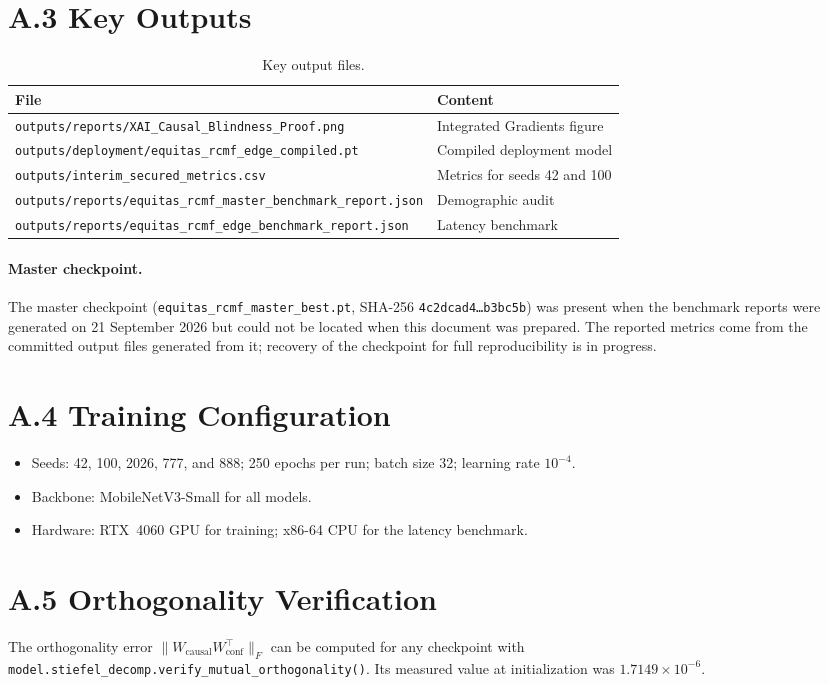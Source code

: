 \section*{A.3 Key Outputs}
\begin{table}[htbp]
\centering
\begin{tabular}{@{}ll@{}}
\toprule
\textbf{File} & \textbf{Content} \\
\midrule
\texttt{outputs/reports/XAI\_Causal\_Blindness\_Proof.png} & Integrated Gradients figure \\
\texttt{outputs/deployment/equitas\_rcmf\_edge\_compiled.pt} & Compiled deployment model \\
\texttt{outputs/interim\_secured\_metrics.csv} & Metrics for seeds 42 and 100 \\
\texttt{outputs/reports/equitas\_rcmf\_master\_benchmark\_report.json} & Demographic audit \\
\texttt{outputs/reports/equitas\_rcmf\_edge\_benchmark\_report.json} & Latency benchmark \\
\bottomrule
\end{tabular}
\caption{Key output files.}
\end{table}

\paragraph{Master checkpoint.} The master checkpoint (\texttt{equitas\_rcmf\_master\_best.pt}, SHA-256 \texttt{4c2dcad4\ldots b3bc5b}) was present when the benchmark reports were generated on 21 September 2026 but could not be located when this document was prepared. The reported metrics come from the committed output files generated from it; recovery of the checkpoint for full reproducibility is in progress.

\section*{A.4 Training Configuration}
\begin{itemize}
    \item Seeds: 42, 100, 2026, 777, and 888; 250 epochs per run; batch size 32; learning rate $10^{-4}$.
    \item Backbone: MobileNetV3-Small for all models.
    \item Hardware: RTX~4060 GPU for training; x86-64 CPU for the latency benchmark.
\end{itemize}

\section*{A.5 Orthogonality Verification}
The orthogonality error $\|W_{\text{causal}} W_{\text{conf}}^{\top}\|_F$ can be computed for any checkpoint with \texttt{model.stiefel\_decomp.verify\_mutual\_orthogonality()}. Its measured value at initialization was $1.7149 \times 10^{-6}$.

